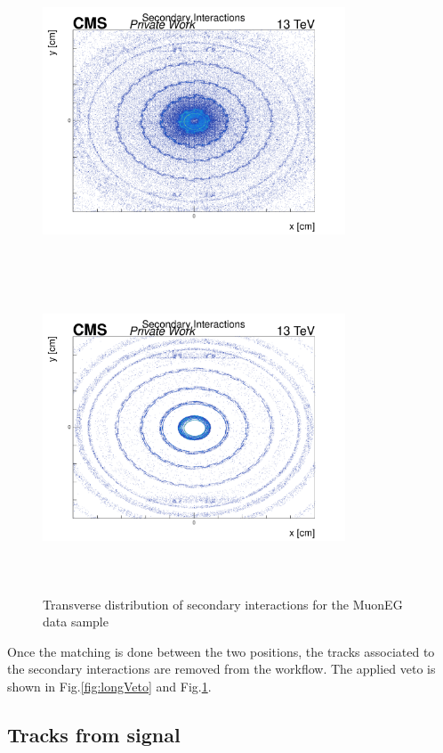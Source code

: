 \documentclass{cernatlasnote}
\begin{document}
\begin{figure}[ht]
\hspace{-1 cm}
\includegraphics[height=9cm, width=9cm, trim= 0cm 0cm 0cm 0.cm,clip]{images/SecInt/X_Y_Selec_ETA.pdf}\includegraphics[height=9cm, width=9cm, trim= 0cm 0cm 0cm 0.cm,clip]{images/SecInt/X_Y_TrackerMatched_eta.pdf}
\caption{\label{fig:Veto} Transverse distribution of secondary interactions for the MuonEG data sample}
\end{figure}
        \FloatBarrier

    Once the matching is done between the two positions, the tracks associated to the secondary interactions are removed from the workflow. The applied veto is shown in Fig.\ref{fig:longVeto} and Fig.\ref{fig:Veto}.
        
    \subsection{Tracks from signal}
        \label{SUB:BDTRK}
\end{document}
